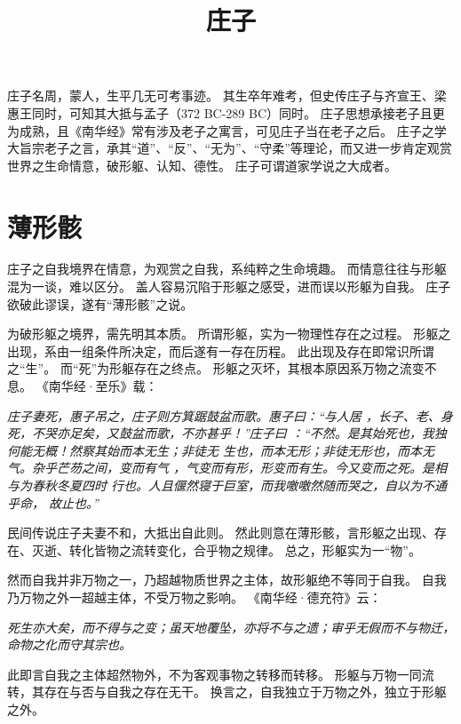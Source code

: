 \documentclass[11pt]{article}
\title{庄子}
\date{}
\begin{document}
  \maketitle

  \linenumbers

庄子名周，蒙人，生平几无可考事迹。
其生卒年难考，但史传庄子与齐宣王、梁惠王同时，可知其大抵与孟子（372 BC-289 BC）同时。
庄子思想承接老子且更为成熟，且《南华经》常有涉及老子之寓言，可见庄子当在老子之后。
庄子之学大旨宗老子之言，承其“道”、“反”、“无为”、“守柔”等理论，而又进一步肯定观赏世界之生命情意，破形躯、认知、德性。
庄子可谓道家学说之大成者。

\section{薄形骸}
庄子之自我境界在情意，为观赏之自我，系纯粹之生命境趣。
而情意往往与形躯混为一谈，难以区分。
盖人容易沉陷于形躯之感受，进而误以形躯为自我。
庄子欲破此谬误，遂有“薄形骸”之说。

\newline

为破形躯之境界，需先明其本质。
所谓形躯，实为一物理性存在之过程。
形躯之出现，系由一组条件所决定，而后遂有一存在历程。
此出现及存在即常识所谓之“生”。
而“死”为形躯存在之终点。
形躯之灭坏，其根本原因系万物之流变不息。
《南华经·至乐》载：

\textit{庄子妻死，惠子吊之，庄子则方箕踞鼓盆而歌。惠子曰：“与人居 ，长子、老、身死，不哭亦足矣，又鼓盆而歌，不亦甚乎！”庄子曰 ：“不然。是其始死也，我独何能无概！然察其始而本无生；非徒无 生也，而本无形；非徒无形也，而本无气。杂乎芒芴之间，变而有气 ，气变而有形，形变而有生。今又变而之死。是相与为春秋冬夏四时 行也。人且偃然寝于巨室，而我噭噭然随而哭之，自以为不通乎命， 故止也。”}

民间传说庄子夫妻不和，大抵出自此则。
然此则意在薄形骸，言形躯之出现、存在、灭逝、转化皆物之流转变化，合乎物之规律。
总之，形躯实为一“物”。

\newline

然而自我并非万物之一，乃超越物质世界之主体，故形躯绝不等同于自我。
自我乃万物之外一超越主体，不受万物之影响。
《南华经·德充符》云：


\textit{死生亦大矣，而不得与之变；虽天地覆坠，亦将不与之遗；审乎无假而不与物迁，命物之化而守其宗也。}

此即言自我之主体超然物外，不为客观事物之转移而转移。
形躯与万物一同流转，其存在与否与自我之存在无干。
换言之，自我独立于万物之外，独立于形躯之外。
\end{document}
